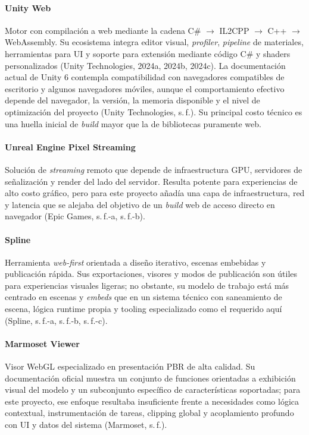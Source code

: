 \paragraph{Unity Web} Motor con compilación a web mediante la cadena C\# $\rightarrow$ IL2CPP $\rightarrow$ C++ $\rightarrow$ WebAssembly. Su ecosistema integra editor visual, \textit{profiler}, \textit{pipeline} de materiales, herramientas para UI y soporte para extensión mediante código C\# y shaders personalizados (Unity Technologies, 2024a, 2024b, 2024c). La documentación actual de Unity 6 contempla compatibilidad con navegadores compatibles de escritorio y algunos navegadores móviles, aunque el comportamiento efectivo depende del navegador, la versión, la memoria disponible y el nivel de optimización del proyecto (Unity Technologies, s.\,f.). Su principal costo técnico es una huella inicial de \textit{build} mayor que la de bibliotecas puramente web.

\paragraph{Unreal Engine Pixel Streaming} Solución de \textit{streaming} remoto que depende de infraestructura GPU, servidores de señalización y render del lado del servidor. Resulta potente para experiencias de alto costo gráfico, pero para este proyecto añadía una capa de infraestructura, red y latencia que se alejaba del objetivo de un \textit{build} web de acceso directo en navegador (Epic Games, s.\,f.-a, s.\,f.-b).

\paragraph{Spline} Herramienta \textit{web-first} orientada a diseño iterativo, escenas embebidas y publicación rápida. Sus exportaciones, visores y modos de publicación son útiles para experiencias visuales ligeras; no obstante, su modelo de trabajo está más centrado en escenas y \textit{embeds} que en un sistema técnico con saneamiento de escena, lógica runtime propia y tooling especializado como el requerido aquí (Spline, s.\,f.-a, s.\,f.-b, s.\,f.-c).

\paragraph{Marmoset Viewer} Visor WebGL especializado en presentación PBR de alta calidad. Su documentación oficial muestra un conjunto de funciones orientadas a exhibición visual del modelo y un subconjunto específico de características soportadas; para este proyecto, ese enfoque resultaba insuficiente frente a necesidades como lógica contextual, instrumentación de tareas, clipping global y acoplamiento profundo con UI y datos del sistema (Marmoset, s.\,f.).

